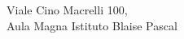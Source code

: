 \documentclass[preview]{standalone}
\begin{document}
\begin{center}
Viale Cino Macrelli 100,\\Aula Magna Istituto Blaise Pascal
\end{center}
\end{document}
